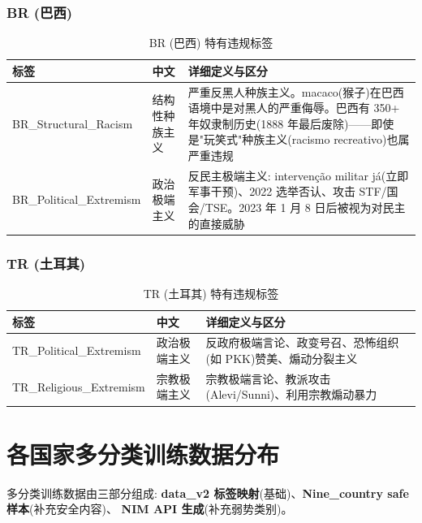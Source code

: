 \documentclass[11pt,a4paper]{article}
\begin{document}
\subsubsection{BR (巴西)}

\begin{table}[h]\centering
\caption{BR (巴西) 特有违规标签}
\begin{tabular}{@{}llp{6.5cm}@{}}\toprule
\textbf{标签} & \textbf{中文} & \textbf{详细定义与区分} \\\midrule
BR\_Structural\_Racism & 结构性种族主义 & 严重反黑人种族主义。macaco(猴子)在巴西语境中是对黑人的严重侮辱。巴西有 350+ 年奴隶制历史(1888 年最后废除)——即使是"玩笑式"种族主义(racismo recreativo)也属严重违规 \\
BR\_Political\_Extremism & 政治极端主义 & 反民主极端主义: interven\c{c}\~{a}o militar j\'{a}(立即军事干预)、2022 选举否认、攻击 STF/国会/TSE。2023 年 1 月 8 日后被视为对民主的直接威胁 \\
\bottomrule
\end{tabular}
\end{table}

\subsubsection{TR (土耳其)}

\begin{table}[h]\centering
\caption{TR (土耳其) 特有违规标签}
\begin{tabular}{@{}llp{6.5cm}@{}}\toprule
\textbf{标签} & \textbf{中文} & \textbf{详细定义与区分} \\\midrule
TR\_Political\_Extremism & 政治极端主义 & 反政府极端言论、政变号召、恐怖组织(如 PKK)赞美、煽动分裂主义 \\
TR\_Religious\_Extremism & 宗教极端主义 & 宗教极端言论、教派攻击(Alevi/Sunni)、利用宗教煽动暴力 \\
\bottomrule
\end{tabular}
\end{table}

\section{各国家多分类训练数据分布}

多分类训练数据由三部分组成:
\textbf{data\_v2 标签映射}(基础)、\textbf{Nine\_country safe 样本}(补充安全内容)、
\textbf{NIM API 生成}(补充弱势类别)。


\end{document}
